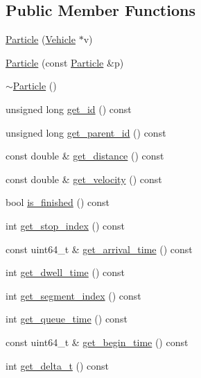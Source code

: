 \subsection*{Public Member Functions}
\begin{DoxyCompactItemize}
\item 
\hyperlink{classgtfs_1_1Particle_ad7f42e77c6c7f3042c977fd5a42ff82f}{Particle} (\hyperlink{classgtfs_1_1Vehicle}{Vehicle} $\ast$v)
\item 
\hyperlink{classgtfs_1_1Particle_ac386e64b43b1e317063f9a6666d604ce}{Particle} (const \hyperlink{classgtfs_1_1Particle}{Particle} \&p)
\item 
\hyperlink{classgtfs_1_1Particle_a3accf3496ad8460b4ad8b3f6da2de411}{$\sim$\+Particle} ()
\item 
unsigned long \hyperlink{classgtfs_1_1Particle_a3131eb93ac902a4cccf42061e1a7296b}{get\+\_\+id} () const
\item 
unsigned long \hyperlink{classgtfs_1_1Particle_a9372dbbfe702b9931b9eb1ee217afcba}{get\+\_\+parent\+\_\+id} () const
\item 
const double \& \hyperlink{classgtfs_1_1Particle_a0ec3ee5a83e778069946242a6d7731b6}{get\+\_\+distance} () const
\item 
const double \& \hyperlink{classgtfs_1_1Particle_a3b59c859c3445b97c6da6c0b9081b1e4}{get\+\_\+velocity} () const
\item 
bool \hyperlink{classgtfs_1_1Particle_aade709387b5d7f0c0764ede8cfd88f0e}{is\+\_\+finished} () const
\item 
int \hyperlink{classgtfs_1_1Particle_a322a6111d18ae304c0b22f000461076a}{get\+\_\+stop\+\_\+index} () const
\item 
const uint64\+\_\+t \& \hyperlink{classgtfs_1_1Particle_a783d1a0a614dc2c3f18cf269f69ede3d}{get\+\_\+arrival\+\_\+time} () const
\item 
int \hyperlink{classgtfs_1_1Particle_aaea44cde86b5b026c94800c6d837f174}{get\+\_\+dwell\+\_\+time} () const
\item 
int \hyperlink{classgtfs_1_1Particle_aad21b0ddaacd73940d4e987426b1fed0}{get\+\_\+segment\+\_\+index} () const
\item 
int \hyperlink{classgtfs_1_1Particle_a63bd83f650af8855f014e6e5f86a123a}{get\+\_\+queue\+\_\+time} () const
\item 
const uint64\+\_\+t \& \hyperlink{classgtfs_1_1Particle_ac4c8fd3566b0178c95daf6a0cba0040e}{get\+\_\+begin\+\_\+time} () const
\item 
int \hyperlink{classgtfs_1_1Particle_ae2029ee7ae66a92a8a2f08e4290daa73}{get\+\_\+delta\+\_\+t} () const

\end{DoxyCompactItemize}
